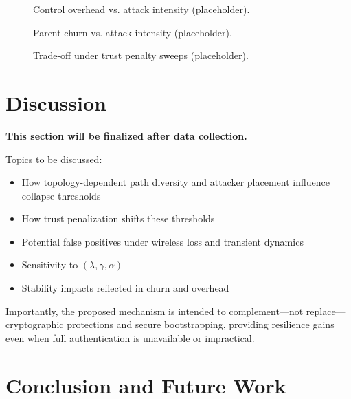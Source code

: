 \documentclass[11pt,a4paper]{article}
\begin{document}
\begin{figure}[t]
  \centering
  \caption{Control overhead vs. attack intensity (placeholder).}
  \label{fig:overhead}
\end{figure}

\begin{figure}[t]
  \centering
  \caption{Parent churn vs. attack intensity (placeholder).}
  \label{fig:parent-switch}
\end{figure}

\begin{figure}[t]
  \centering
  \caption{Trade-off under trust penalty sweeps (placeholder).}
  \label{fig:lambda-tradeoff}
\end{figure}

\section{Discussion}
\label{sec:discussion}

\noindent\textbf{This section will be finalized after data collection.}

Topics to be discussed:
\begin{itemize}[leftmargin=*]
  \item How topology-dependent path diversity and attacker placement influence collapse thresholds
  \item How trust penalization shifts these thresholds
  \item Potential false positives under wireless loss and transient dynamics
  \item Sensitivity to $(\lambda,\gamma,\alpha)$
  \item Stability impacts reflected in churn and overhead
\end{itemize}

Importantly, the proposed mechanism is intended to complement—not replace—cryptographic protections and secure bootstrapping, providing resilience gains even when full authentication is unavailable or impractical.

\section{Conclusion and Future Work}
\label{sec:conclusion}
\end{document}
